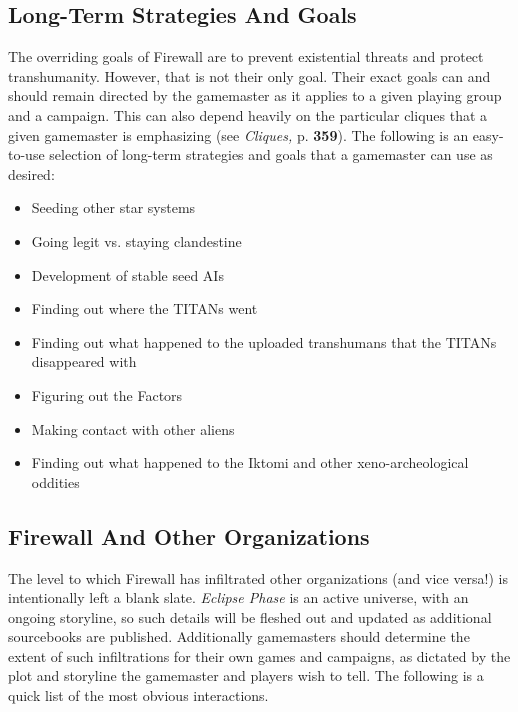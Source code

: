 \subsection{Long-Term Strategies And Goals }

The overriding goals of Firewall are to prevent existential
threats and protect transhumanity. However, that
is not their only goal. Their exact goals can and should 
remain directed by the gamemaster as it applies to a 
given playing group and a campaign. This can also 
depend heavily on the particular cliques that a given 
gamemaster is emphasizing (see \textit{Cliques,} p. \textbf{359}). 
The following is an easy-to-use selection of long-term
strategies and goals that a gamemaster can use
as desired: 

\begin{itemize}
\item  Seeding other star systems 
\item  Going legit vs. staying clandestine 
\item  Development of stable seed AIs 
\item  Finding out where the TITANs went 
\item  Finding out what happened to the uploaded transhumans that the TITANs disappeared with 
\item  Figuring out the Factors 
\item  Making contact with other aliens 
\item  Finding out what happened to the Iktomi and other xeno-archeological oddities 
\end{itemize}


\subsection{Firewall And Other Organizations }

The level to which Firewall has infiltrated other organizations
(and vice versa!) is intentionally left a blank
slate. \textit{Eclipse Phase }is an active universe, with an ongoing
storyline, so such details will be fleshed out and
updated as additional sourcebooks are published. Additionally
gamemasters should determine the extent of
such infiltrations for their own games and campaigns, 
as dictated by the plot and storyline the gamemaster 
and players wish to tell. 
The following is a quick list of the most obvious 
interactions.

